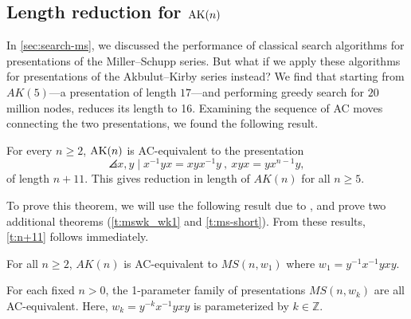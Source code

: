 

\subsection{Length reduction for $\text{AK}(n)$}
\label{sec:len-reduction}

In \cref{sec:search-ms}, we discussed the performance of classical search algorithms for presentations of the Miller--Schupp series. But what if we apply these algorithms for presentations of the Akbulut--Kirby series instead? We find that starting from $AK(5)$---a presentation of length $17$---and performing greedy search for $20$ million nodes, reduces its length to 16. Examining the sequence of AC moves connecting the two presentations, we found the following result.

\begin{theorem}\label{t:n+11}
	For every $n\geq 2$, $\text{AK}(n)$ is AC-equivalent to the presentation
	\[
	\angles{ x,y \mid x^{-1} y x = x y x^{-1} y \ ,\  xyx=yx^{n-1}y },
	\]
	of length $n+11$. This gives reduction in length of $AK(n)$ for all $n \geq 5$.
\end{theorem}

To prove this theorem, we will  use the following result due to \cite{MMS}, and prove two additional theorems (\cref{t:mswk_wk1} and \cref{t:ms-short}). From these results, \cref{t:n+11} follows immediately. 

\begin{proposition}
    \label{t:MS-AK-MS}
    For all $n \geq 2$, $AK(n)$ is AC-equivalent to $MS(n, w_1)$ where $w_1 = y^{-1} x^{-1} y x y$.
\end{proposition}

\begin{theorem}\label{t:mswk_wk1}
    For each fixed $n > 0$, the 1-parameter family of presentations $MS(n, w_k)$ are all AC-equivalent. Here, $w_k = y^{-k} x^{-1} y x y$ is parameterized by $k \in \mathbb{Z}$. 
\end{theorem}


